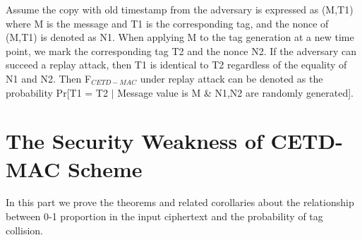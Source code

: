 \documentclass{article}
\begin{document}
Assume the copy with old timestamp from the adversary is expressed as (M,T1) where M is the message and T1 is the corresponding tag, and the nonce of (M,T1) is denoted as N1. When applying M to the tag generation at a new time point, we mark the corresponding tag T2 and the nonce N2. If the adversary can succeed a replay attack, then T1 is identical to T2 regardless of the equality of N1 and N2.
Then F$_{CETD-MAC}$ under replay attack can be denoted as the probability Pr[T1 = T2 $\mid$ Message value is M \& N1,N2 are randomly generated]. 

%





\appendix
\section{The Security Weakness of CETD-MAC Scheme}
In this part we prove the theorems and related corollaries about the relationship between 0-1 proportion in the input ciphertext and the probability of tag collision.
\end{document}
